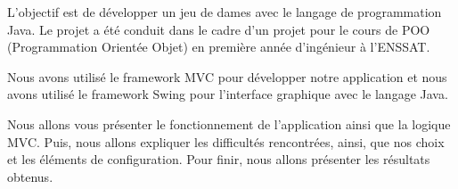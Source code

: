 L'objectif est de développer un jeu de dames avec le langage de programmation Java. 
Le projet a été conduit dans le cadre d'un projet pour le cours de POO (Programmation Orientée Objet) 
en première année d'ingénieur à l'ENSSAT. \medskip

Nous avons utilisé le framework MVC pour développer notre application et 
nous avons utilisé le framework Swing pour l'interface graphique avec le langage Java. \medskip

Nous allons vous présenter le fonctionnement de l'application ainsi que la logique MVC.
Puis, nous allons expliquer les difficultés rencontrées, ainsi, que nos choix et les éléments 
de configuration. Pour finir, nous allons présenter les résultats obtenus.
